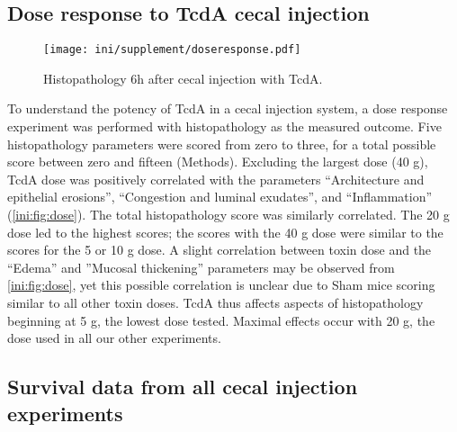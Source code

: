 \subsection{Dose response to TcdA cecal injection}

\begin{figure}[h!]
\centering
\texttt{[image: ini/supplement/doseresponse.pdf]}
\caption{Histopathology 6h after cecal injection with TcdA.}
\label{ini:fig:dose}
\end{figure}

To understand the potency of TcdA in a cecal injection system, a dose response
experiment was performed with histopathology as the measured outcome.
Five histopathology parameters were scored from zero to three, for a total possible score
between zero and fifteen (Methods). Excluding the largest dose (40 \textmugreek{}g),
TcdA dose was positively correlated with the parameters ``Architecture and epithelial erosions'', 
``Congestion and luminal exudates'', and
``Inflammation'' (\autoref{ini:fig:dose}). The total histopathology score was similarly correlated.
The 20 \textmugreek{}g dose led to the highest scores; the scores with
the 40 \textmugreek{}g dose were similar to the scores for the 5 or 10 \textmugreek{}g dose.
A slight correlation between toxin dose and the ``Edema'' and ''Mucosal thickening''
parameters may be observed from \autoref{ini:fig:dose}, yet this possible
correlation is unclear due to Sham mice scoring similar to all other toxin doses.
TcdA thus affects aspects of histopathology beginning at 5 \textmugreek{}g, the lowest
dose tested. Maximal effects occur with 20 \textmugreek{}g, the dose used in all our
other experiments.

\FloatBarrier

\subsection{Survival data from all cecal injection experiments}

